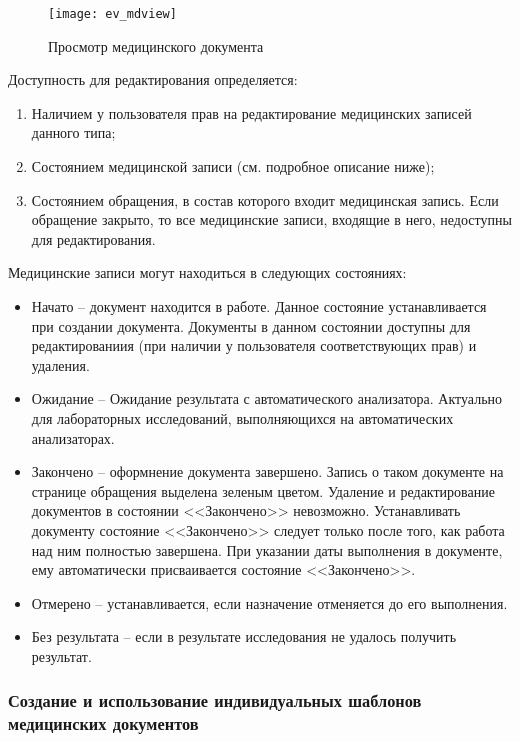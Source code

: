 { \begin{figure}[ht]\centering
   \texttt{[image: ev\_mdview]}
   \caption{Просмотр медицинского документа}
   \label{img_ev_mdview}
 \end{figure}

Доступность для редактирования определяется:
\begin{enumerate}
 \item Наличием у пользователя прав на редактирование медицинских записей данного типа;
 \item Состоянием медицинской записи (см. подробное описание ниже);
 \item Состоянием обращения, в состав которого входит медицинская запись. Если обращение закрыто, то все медицинские записи, входящие в него, недоступны для редактирования.  
\end{enumerate} 

Медицинские записи могут находиться в следующих состояниях:
\begin{itemize}
 \item Начато -- документ находится в работе. Данное состояние устанавливается при создании документа. Документы в данном состоянии доступны для редактированиия (при наличии у пользователя соответствующих прав) и удаления.
 \item Ожидание -- Ожидание результата с автоматического анализатора. Актуально для лабораторных исследований, выполняющихся на автоматических анализаторах. 
 \item Закончено -- оформнение документа завершено. Запись о таком документе на странице обращения выделена зеленым цветом. Удаление и редактирование документов в состоянии <<Закончено>> невозможно. Устанавливать документу состояние <<Закончено>>   следует только после того, как работа над ним полностью завершена. При указании даты выполнения в документе, ему автоматически присваивается состояние  <<Закончено>>. 
 \item Отмерено -- устанавливается, если назначение отменяется до его выполнения.
 \item Без результата -- если в результате исследования не удалось получить результат. 
\end{itemize}

\subsubsection{Создание и использование индивидуальных шаблонов медицинских документов} \label{ev_pattern}

}
